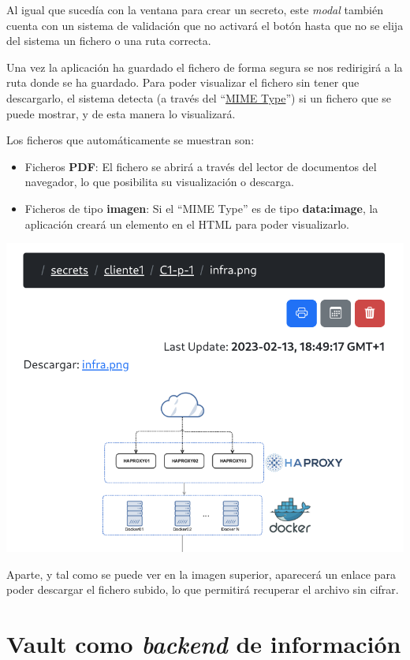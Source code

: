 \documentclass{\ClassPath/viu-tfm-template}
\begin{document}
Al igual que sucedía con la ventana para crear un secreto, este \textit{modal} también cuenta con un sistema de validación que no activará el botón hasta que no se elija del sistema un fichero o una ruta correcta.

Una vez la aplicación ha guardado el fichero de forma segura se nos redirigirá a la ruta donde se ha guardado. Para poder visualizar el fichero sin tener que descargarlo, el sistema detecta (a través del “\href{https://en.wikipedia.org/wiki/Media_type}{MIME Type}”) si un fichero que se puede mostrar, y de esta manera lo visualizará.

Los ficheros que automáticamente se muestran son:

\begin{itemize}
    \item Ficheros \textbf{PDF}: El fichero se abrirá a través del lector de documentos del navegador, lo que posibilita su visualización o descarga.
    \item Ficheros de tipo \textbf{imagen}: Si el “MIME Type” es de tipo \textbf{data:image}, la aplicación creará un elemento en el HTML para poder visualizarlo.
\end{itemize}

\begin{center}
    \includegraphics[frame,width=0.7\linewidth]{img/upload_download.png}
\end{center}

Aparte, y tal como se puede ver en la imagen superior, aparecerá un enlace para poder descargar el fichero subido, lo que permitirá recuperar el archivo sin cifrar.


\section{Vault como \textit{backend} de información}
\end{document}
